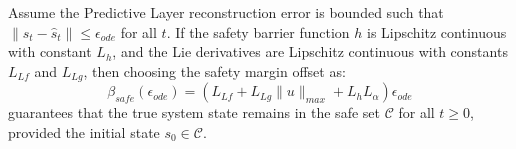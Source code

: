 \documentclass[manuscript, screen, review]{jair}
\begin{document}
\begin{theorem}
Assume the Predictive Layer reconstruction error is bounded such that $\|s_t - \hat{s}_t\| \le \epsilon_{ode}$ for all $t$. If the safety barrier function $h$ is Lipschitz continuous with constant $L_h$, and the Lie derivatives are Lipschitz continuous with constants $L_{Lf}$ and $L_{Lg}$, then choosing the safety margin offset as:
\begin{equation}
    \beta_{safe}(\epsilon_{ode}) = \left( L_{Lf} + L_{Lg} \|u\|_{max} + L_h L_\alpha \right) \epsilon_{ode}
\end{equation}
guarantees that the true system state remains in the safe set $\mathcal{C}$ for all $t \ge 0$, provided the initial state $s_0 \in \mathcal{C}$.
\end{theorem}
\end{document}
